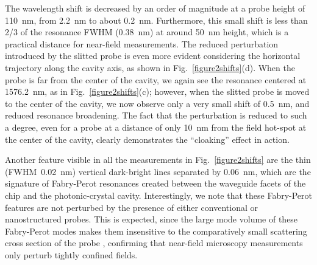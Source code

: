 \documentclass{osa-article}
\begin{document}
	The wavelength shift is decreased by an order of magnitude at a probe height of 110~nm, from 2.2~nm to about 0.2~nm. Furthermore, this small shift is less than 2/3 of the resonance FWHM (0.38~nm) at around 50~nm height, which is a practical distance for near-field measurements.
	The reduced perturbation introduced by the slitted probe is even more evident considering the horizontal trajectory along the cavity axis, as shown in Fig.~\ref{figure2shifts}(d). When the probe is far from the center of the cavity, we again see the resonance centered at 1576.2~nm, as in Fig.~\ref{figure2shifts}(c); however, when the slitted probe is moved to the center of the cavity, we now observe only a very small shift of 0.5~nm, and reduced resonance broadening. The fact that the perturbation is reduced to such a degree, even for a probe at a distance of only 10~nm from the field hot-spot at the center of the cavity, clearly demonstrates the ``cloaking'' effect in action.\par 
	Another feature visible in all the measurements in Fig.~\ref{figure2shifts} are the thin (FWHM~0.02~nm) vertical dark-bright lines separated by 0.06~nm, which are the signature of Fabry-Perot resonances created between the waveguide facets of the chip and the photonic-crystal cavity. Interestingly, we note that these Fabry-Perot features are not perturbed by the presence of either conventional or nanostructured probes. This is expected, since the large mode volume of these Fabry-Perot modes makes them insensitive to the comparatively small scattering cross section of the probe \cite{Balistreri_01}, confirming that near-field microscopy measurements only perturb tightly confined fields.\par
	
\end{document}
